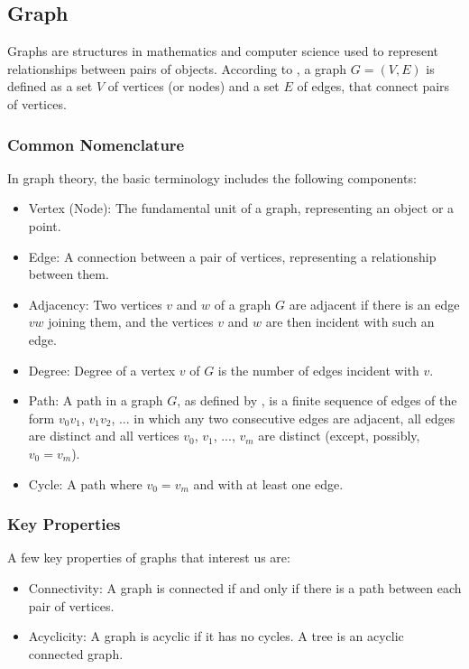 \subsection{Graph}
\label{section_definitions_graph}

Graphs are structures in mathematics and computer science used to represent
relationships between pairs of objects. According to , a graph
$G=(V,E)$ is defined as a set $V$ of vertices (or nodes) and a set $E$ of edges,
that connect pairs of vertices. 

\subsubsection{Common Nomenclature}

In graph theory, the basic terminology includes the following components:

\begin{itemize}
    \item Vertex (Node): The fundamental unit of a graph, representing an object or a point.
    \item Edge: A connection between a pair of vertices, representing a relationship between them.
    \item Adjacency: Two vertices $v$ and $w$ of a graph $G$ are adjacent if there is an edge $vw$ joining them, and the vertices $v$ and $w$ are then incident with such an edge. \cite{West2018}
    \item Degree: Degree of a vertex $v$ of $G$ is the number of edges incident with $v$. \cite{West2018}
    \item Path: A path in a graph $G$, as defined by , is a finite sequence of edges of the form $v_0v_1$, $v_1v_2$, ... in which any two consecutive edges are adjacent, all edges are distinct and all vertices $v_0$, $v_1$, ..., $v_m$ are distinct (except, possibly, $v_0 = v_m$).
    \item Cycle: A path where $v_0 = v_m$ and with at least one edge. \cite{West2018}
\end{itemize}

\subsubsection{Key Properties}

A few key properties of graphs that interest us are:

\begin{itemize}
    \item Connectivity: A graph is connected if and only if there is a path between each pair of vertices. \cite{West2018}
    \item Acyclicity: A graph is acyclic if it has no cycles. A tree is an acyclic connected graph.
\end{itemize}

